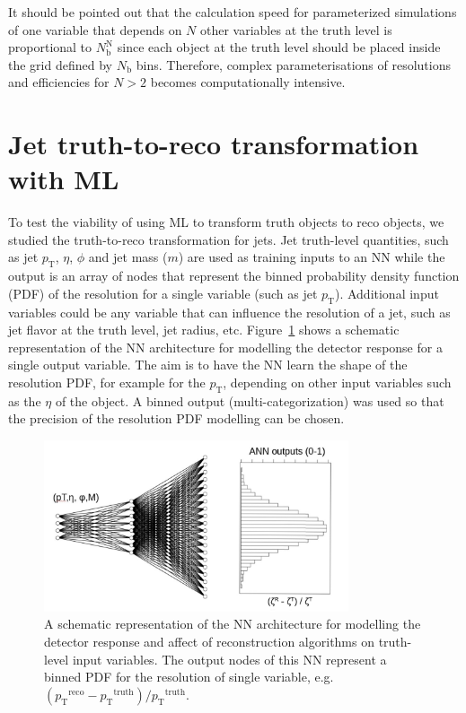 \documentclass[showpacs,showkeys,preprint,prd,nofootinbib,linenumbers,12pt,superscriptaddress]{revtex4-1}
\def\pt{\ensuremath{p_{\mathrm{T}}}}
\def\ptRes{\ensuremath{(\pt^{\mathrm{reco}}-\pt^{\mathrm{truth}})/\pt^{\mathrm{truth}}}}
\begin{document}
It should be pointed out that the calculation speed for parameterized simulations of one variable that depends on $N$ other variables at the truth level is proportional to $N_{\mathrm{b}}^{\mathrm{N}}$ since each object at the truth level should be placed inside the grid defined by $N_{\mathrm{b}}$ bins. Therefore, complex parameterisations of resolutions and efficiencies for $N>2$ becomes computationally intensive. 

\section{Jet truth-to-reco transformation with ML}

To test the viability of using ML to transform truth objects to reco objects, we studied the truth-to-reco transformation for jets. Jet truth-level quantities, such as jet $\pt$, $\eta$, $\phi$ and jet mass ($m$) are used as training inputs to an NN while the output
is an array of nodes that represent the binned probability density function (PDF) of the resolution for a single variable (such as jet \pt). Additional input variables could be any variable that can influence the resolution of a jet, such as jet flavor at the truth level, jet radius, etc. Figure~\ref{ann_example} shows a schematic representation of the NN architecture for modelling the detector response for a single output variable. The aim is to have the NN learn the shape of the resolution PDF, for example for the $\pt$, depending on other input variables such as the $\eta$ of the object. A binned output (multi-categorization) was used so that the precision of the resolution PDF modelling can be chosen.

\begin{figure}[h]
  \includegraphics[width=0.8\textwidth]{figures/intro/nn_example.pdf}
  \caption{A schematic representation of the NN architecture for modelling the detector response and affect of reconstruction algorithms on truth-level input variables. The output nodes of this NN represent a binned PDF for the resolution of single variable, e.g. \ptRes.}
  \label{ann_example}
\end{figure}
\end{document}
